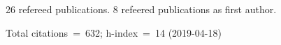 26 refereed publications. 8 refeered publications as first author.

Total citations~=~632; h-index~=~14 (2019-04-18)